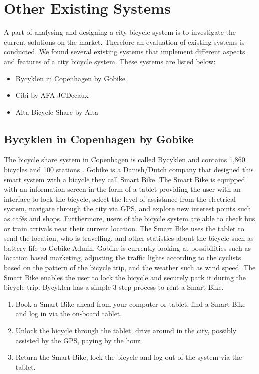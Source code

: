 \section{Other Existing Systems}\label{sec:existing-systems}
A part of analysing and designing a city bicycle system is to investigate the current solutions on the market. 
Therefore an evaluation of existing systems is conducted.
We found several existing systems that implement different aspects and features of a city bicycle system. 
These systems are listed below:
\begin{itemize}
\item Bycyklen in Copenhagen by Gobike
\item Cibi by AFA JCDecaux
\item Alta Bicycle Share by Alta
\end{itemize}
\subsection{Bycyklen in Copenhagen by Gobike}
The bicycle share system in Copenhagen is called Bycyklen and contains 1,860 bicycles and 100 stations \citep{misc:bycykelwinde}. 
Gobike \citep{misc:bycyklen} is a Danish/Dutch company that designed this smart system with a bicycle they call Smart Bike. 
The Smart Bike is equipped with an information screen in the form of a tablet providing the user with an interface to lock the bicycle, select the level of assistance from the electrical system, navigate through the city via GPS, and explore new interest points such as cafés and shops.
Furthermore, users of the bicycle system are able to check bus or train arrivals near their current location.
The Smart Bike uses the tablet to send the location, who is travelling, and other statistics about the bicycle such as battery life to Gobike Admin.
Gobike is currently looking at possibilities such as location based marketing, adjusting the traffic lights according to the cyclists based on the pattern of the bicycle trip, and the weather such as wind speed.
The Smart Bike enables the user to lock the bicycle and securely park it during the bicycle trip.
Bycyklen has a simple 3-step process to rent a Smart Bike.
\begin{enumerate}
\item Book a Smart Bike ahead from your computer or tablet, find a Smart Bike and log in via the on-board tablet.
\item Unlock the bicycle through the tablet, drive around in the city, possibly assisted by the GPS, paying by the hour.
\item Return the Smart Bike, lock the bicycle and log out of the system via the tablet.
\end{enumerate}

